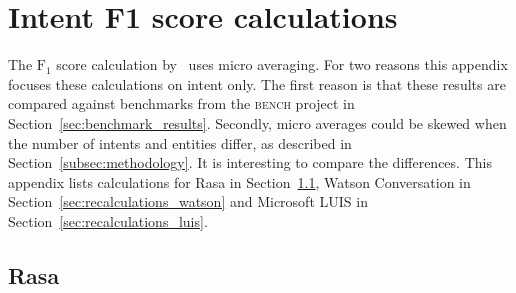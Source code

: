 \chapter{Intent F1 score calculations}
\label{ch:intent_f1_score_calculations}

The $\text{F}_1$ score calculation by~\citep{braun2017} uses micro averaging.
For two reasons this appendix focuses these calculations on intent only.
The first reason is that these results are compared against benchmarks from the \textsc{bench} project in Section~\ref{sec:benchmark_results}.
Secondly, micro averages could be skewed when the number of intents and entities differ, as described in Section~\ref{subsec:methodology}.
It is interesting to compare the differences.
This appendix lists calculations for Rasa in Section~\ref{sec:recalculations_rasa}, Watson Conversation in Section~\ref{sec:recalculations_watson} and Microsoft LUIS in Section~\ref{sec:recalculations_luis}.

\section{Rasa}
\label{sec:recalculations_rasa}
\vspace*{1cm}

